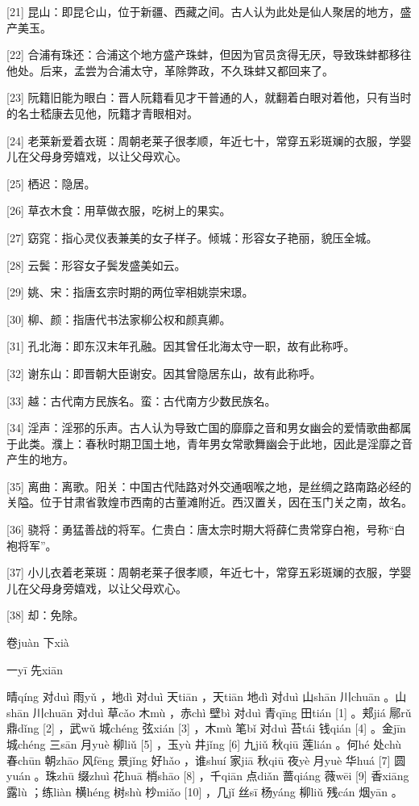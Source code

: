 \documentclass[12pt,UTF8]{ctexbook}
\begin{document}
[21] 昆山：即昆仑山，位于新疆、西藏之间。古人认为此处是仙人聚居的地方，盛产美玉。

[22] 合浦有珠还：合浦这个地方盛产珠蚌，但因为官员贪得无厌，导致珠蚌都移往他处。后来，孟尝为合浦太守，革除弊政，不久珠蚌又都回来了。

[23] 阮籍旧能为眼白：晋人阮籍看见才干普通的人，就翻着白眼对着他，只有当时的名士嵇康去见他，阮籍才青眼相对。

[24] 老莱新爱着衣斑：周朝老莱子很孝顺，年近七十，常穿五彩斑斓的衣服，学婴儿在父母身旁嬉戏，以让父母欢心。

[25] 栖迟：隐居。

[26] 草衣木食：用草做衣服，吃树上的果实。

[27] 窈窕：指心灵仪表兼美的女子样子。倾城：形容女子艳丽，貌压全城。

[28] 云鬓：形容女子鬓发盛美如云。

[29] 姚、宋：指唐玄宗时期的两位宰相姚崇宋璟。

[30] 柳、颜：指唐代书法家柳公权和颜真卿。

[31] 孔北海：即东汉末年孔融。因其曾任北海太守一职，故有此称呼。

[32] 谢东山：即晋朝大臣谢安。因其曾隐居东山，故有此称呼。

[33] 越：古代南方民族名。蛮：古代南方少数民族名。

[34] 淫声：淫邪的乐声。古人认为导致亡国的靡靡之音和男女幽会的爱情歌曲都属于此类。濮上：春秋时期卫国土地，青年男女常歌舞幽会于此地，因此是淫靡之音产生的地方。

[35] 离曲：离歌。阳关：中国古代陆路对外交通咽喉之地，是丝绸之路南路必经的关隘。位于甘肃省敦煌市西南的古董滩附近。西汉置关，因在玉门关之南，故名。

[36] 骁将：勇猛善战的将军。仁贵白：唐太宗时期大将薛仁贵常穿白袍，号称“白袍将军”。

[37] 小儿衣着老莱斑：周朝老莱子很孝顺，年近七十，常穿五彩斑斓的衣服，学婴儿在父母身旁嬉戏，以让父母欢心。

[38] 却：免除。





卷juàn 下xià


一yī 先xiān


晴qíng 对duì 雨yǔ ，地dì 对duì 天tiān ，天tiān 地dì 对duì 山shān 川chuān 。山shān 川chuān 对duì 草cǎo 木mù ，赤chì 壁bì 对duì 青qīng 田tián [1] 。郏jiá 鄏rǔ 鼎dǐng [2] ，武wǔ 城chéng 弦xián [3] ，木mù 笔bǐ 对duì 苔tái 钱qián [4] 。金jīn 城chéng 三sān 月yuè 柳liǔ [5] ，玉yù 井jǐng [6] 九jiǔ 秋qiū 莲lián 。何hé 处chù 春chūn 朝zhāo 风fēng 景jǐng 好hǎo ，谁shuí 家jiā 秋qiū 夜yè 月yuè 华huá [7] 圆yuán 。珠zhū 缀zhuì 花huā 梢shāo [8] ，千qiān 点diǎn 蔷qiáng 薇wēi [9] 香xiāng 露lù ；练liàn 横héng 树shù 杪miǎo [10] ，几jǐ 丝sī 杨yáng 柳liǔ 残cán 烟yān 。
\end{document}
